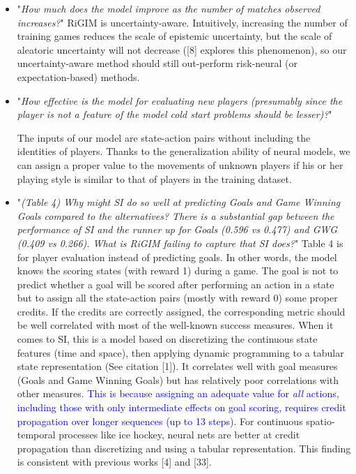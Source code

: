 \documentclass{article}
\begin{document}
\begin{itemize}
    \item "{\it How much does the model improve as the number of matches observed increases?}"
    RiGIM is uncertainty-aware. Intuitively, increasing the number of training games reduces the scale of epistemic uncertainty, but the scale of aleatoric uncertainty will not decrease ([8] explores this phenomenon), so our uncertainty-aware method should still out-perform risk-neural (or expectation-based) methods. 
    
    \item "{\it How effective is the model for evaluating new players (presumably since the player is not a feature of the model cold start problems should be lesser)?}"
    
    The inputs of our model are state-action pairs without including the identities of players. Thanks to the generalization ability of neural models, we can assign a proper value to the movements of unknown players if his or her playing style is similar to that of players in the training dataset.
    
    \item "{\it  (Table 4) Why might SI do so well at predicting Goals and Game Winning Goals compared to the alternatives? There is a substantial gap between the performance of SI and the runner up for Goals (0.596 vs 0.477) and GWG (0.409 vs 0.266). What is RiGIM failing to capture that SI does?}"
    Table 4 is for player evaluation instead of predicting goals. In other words, the model knows the scoring states (with reward 1)  during a game. The goal is not to predict whether a goal will be scored after performing an action in a state but to assign all the state-action pairs (mostly with reward 0) some proper credits. If the credits are correctly assigned, the corresponding metric should be well correlated with most of the well-known success measures.
    When it comes to SI, this is a model based on discretizing the continuous state features (time and space), then applying dynamic programming to a tabular state representation (See citation [1]).
    It correlates well with goal measures (Goals and Game Winning Goals) but has relatively poor correlations with other measures. \textcolor{blue}{This is because assigning an adequate value for {\em all} actions, including those with only intermediate effects on goal scoring, requires credit propagation over longer sequences (up to 13 steps).} For continuous spatio-temporal processes like ice hockey, neural nets are better at credit propagation than discretizing and using a tabular representation.
    This finding is consistent with  previous works [4] and [33].
    

\end{itemize}
\end{document}
